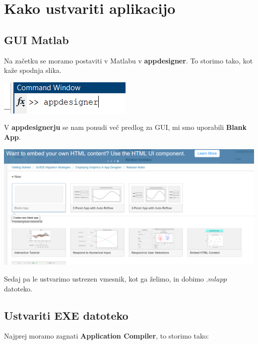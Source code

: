 \documentclass[12pt]{article}
\begin{document}
\newpage

\section{Kako ustvariti aplikacijo}

\subsection{GUI Matlab}
\begin{flushleft}
	Na začetku se moramo postaviti v Matlabu v \textbf{appdesigner}. To storimo tako, kot kaže spodnja slika.
\end{flushleft}
	

\centering
\includegraphics{app1.png}
\linebreak


\begin{flushleft}
	V \textbf{appdesignerju} se nam ponudi več predlog za GUI, mi smo uporabili \textbf{Blank App}.
\end{flushleft}

\centering
\includegraphics[scale=0.70]{app2.png}
	
\begin{flushleft}
	Sedaj pa le ustvarimo ustrezen vmesnik, kot ga želimo, in dobimo $.mlapp$ datoteko.
\end{flushleft}

\subsection{Ustvariti EXE datoteko}

\begin{flushleft}
	Najprej moramo zagnati \textbf{Application Compiler}, to storimo tako:
\end{flushleft}
\end{document}

